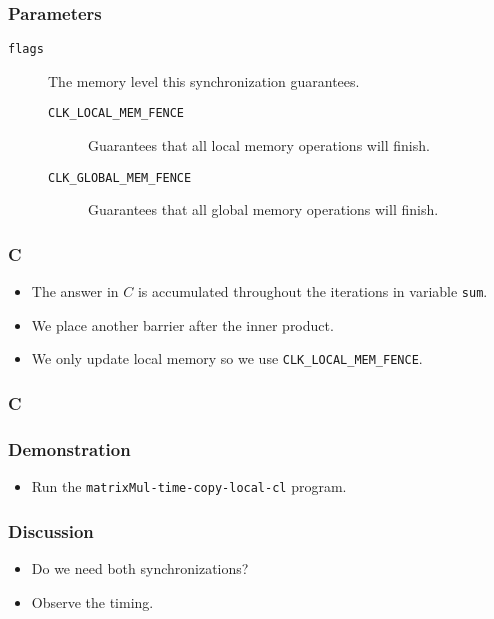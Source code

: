 \documentclass{beamer}
\begin{document}
\begin{frame}
  \frametitle{Parameters}
  \begin{description}
  \item [\tt flags] The memory level this synchronization guarantees.
    \begin{description}
      \item [\tt CLK\_LOCAL\_MEM\_FENCE] Guarantees that all local
        memory operations will finish.
      \item [\tt CLK\_GLOBAL\_MEM\_FENCE] Guarantees that all global
        memory operations will finish.
    \end{description}
  \end{description}
\end{frame}

\begin{frame}
\end{frame}

\begin{frame}
  \frametitle{C}
  \begin{itemize}
    \item The answer in $C$ is accumulated throughout the iterations in
      variable {\tt sum}.
    \item We place another barrier after the inner product.
    \item We only update local memory so we use {\tt CLK\_LOCAL\_MEM\_FENCE}.
  \end{itemize}
\end{frame}

\begin{frame}
  \frametitle{C}
  \centerline{}
\end{frame}

\begin{frame}
  \frametitle{Demonstration}
  \begin{itemize}
    \item Run the {\tt matrixMul-time-copy-local-cl} program.
  \end{itemize}
\end{frame}

\begin{frame}
  \frametitle{Discussion}
  \begin{itemize}
    \item Do we need both synchronizations?
    \item Observe the timing.
  \end{itemize}
\end{frame}
\end{document}
